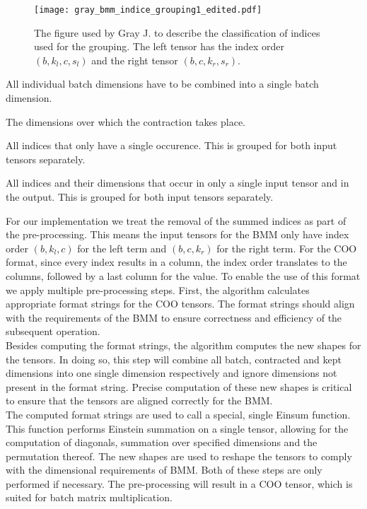 \begin{figure}[H]
    \centering
    \texttt{[image: gray\_bmm\_indice\_grouping1\_edited.pdf]}
    \caption{The figure used by Gray J. \cite{jcmgray}  to describe the classification of indices
        used for the grouping. The left tensor has the index order $(b, k_l, c, s_l)$ and the right
        tensor $(b, c, k_r, s_r)$.}
    \label{fig:bmm:template}
\end{figure}
%
\begin{description}[leftmargin=!,labelwidth=\widthof{\bfseries Contracted Indices (c)}]
    \item [Batch Indices (b)] All individual batch dimensions have to be combined into a single
          batch dimension.
    \item [Contracted Indices (c)] The dimensions over which the contraction takes place.
    \item [Summed Indices (s)] All indices that only have a single occurence. This is grouped for
          both input tensors separately.
    \item [Kept Indices (k)] All indices and their dimensions that occur in only a single input
          tensor and in the output. This is grouped for both input tensors separately.
\end{description}
%
For our implementation we treat the removal of the summed indices as part of the pre-processing.
This means the input tensors for the BMM only have index order $(b, k_l, c)$ for the left term and
$(b, c, k_r)$ for the right term. For the COO format, since every index results in a column,
the index order translates to the columns, followed by a last column for the value. To enable the use
of this format we apply multiple pre-processing steps. First, the algorithm calculates appropriate
format strings for the COO tensors. The format strings should align with the requirements of the BMM
to ensure correctness and efficiency of the subsequent operation.\\
Besides computing the format strings, the algorithm computes the new shapes for the tensors.
In doing so, this step will combine all batch, contracted and kept dimensions into one single dimension
respectively and ignore dimensions not present in the format string. Precise computation of these new
shapes is critical to ensure that the tensors are aligned correctly for the BMM.\\
The computed format strings are used to call a special, single Einsum function. This function performs
Einstein summation on a single tensor, allowing for the computation of diagonals, summation over
specified dimensions and the permutation thereof. The new shapes are used to reshape the tensors to
comply with the dimensional requirements of BMM. Both of these steps are only performed if necessary.
The pre-processing will result in a COO tensor, which is suited for batch matrix multiplication.

